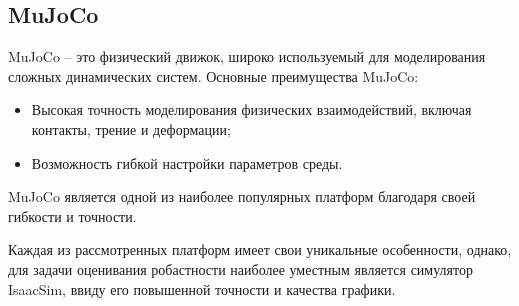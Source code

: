     \subsection{MuJoCo}
    MuJoCo \cite{todorov2012mujoco} -- это физический движок, широко используемый для моделирования сложных динамических систем. Основные преимущества MuJoCo:
    \begin{itemize}
        \item Высокая точность моделирования физических взаимодействий, включая контакты, трение и деформации;
        \item Возможность гибкой настройки параметров среды.
    \end{itemize}
    MuJoCo является одной из наиболее популярных платформ благодаря своей гибкости и точности.

    Каждая из рассмотренных платформ имеет свои уникальные особенности, однако, для задачи оценивания робастности наиболее уместным является симулятор IsaacSim, ввиду его повышенной точности и качества графики. 
